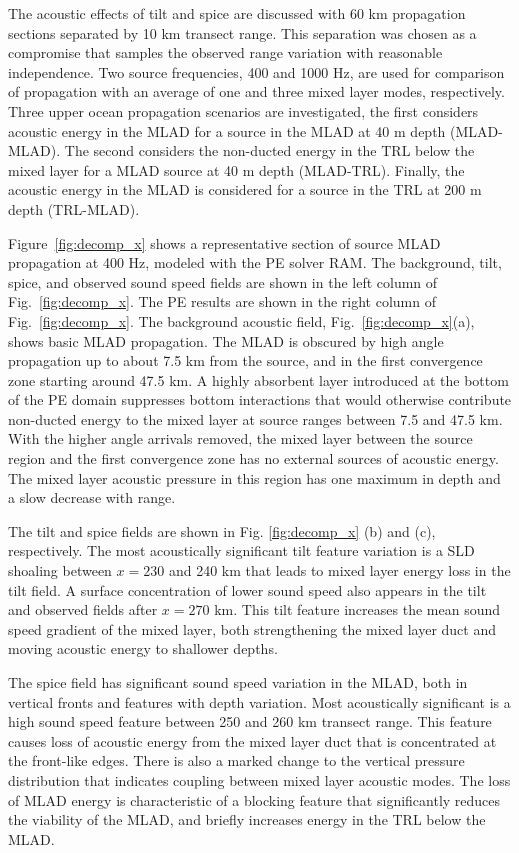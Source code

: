 \documentclass[preprint,NumberedRefs]{JASA}
\begin{document}
The acoustic effects of tilt and spice are discussed with 60 km propagation sections separated by 10 km transect range. This separation was chosen as a compromise that samples the observed range variation with reasonable independence. Two source frequencies, 400 and 1000 Hz, are used for comparison of propagation with an average of one and three mixed layer modes, respectively. Three upper ocean propagation scenarios are investigated, the first considers acoustic energy in the MLAD for a source in the MLAD at 40 m depth (MLAD-MLAD). The second considers the non-ducted energy in the TRL below the mixed layer for a MLAD source at 40 m depth (MLAD-TRL). Finally, the acoustic energy in the MLAD is considered for a source in the TRL at 200 m depth (TRL-MLAD).

Figure~\ref{fig:decomp_x} shows a representative section of source MLAD propagation at 400 Hz, modeled with the PE solver RAM\citep{collins93}. The background, tilt, spice, and observed sound speed fields are shown in the left column of Fig.~\ref{fig:decomp_x}. The PE results are shown in the right column  of Fig.~\ref{fig:decomp_x}. The background acoustic field, Fig.~\ref{fig:decomp_x}(a), shows basic MLAD propagation. The MLAD is obscured by high angle propagation up to about 7.5 km from the source, and in the first convergence zone starting around 47.5 km. A highly absorbent layer introduced at the bottom of the PE domain suppresses bottom interactions that would otherwise contribute non-ducted energy to the mixed layer at source ranges between 7.5 and 47.5 km. With the higher angle arrivals removed, the mixed layer between the source region and the first convergence zone has no external sources of acoustic energy. The mixed layer acoustic pressure in this region has one maximum in depth and a slow decrease with range.

The tilt and spice fields are shown in Fig. \ref{fig:decomp_x} (b) and (c), respectively. The most acoustically significant tilt feature variation is a SLD shoaling between $x=230$ and 240 km that leads to mixed layer energy loss in the tilt field. A surface concentration of lower sound speed also appears in the tilt and observed fields after $x=270$ km. This tilt feature increases the mean sound speed gradient of the mixed layer, both strengthening the mixed layer duct and moving acoustic energy to shallower depths.

The spice field has significant sound speed variation in the MLAD, both in vertical fronts and features with depth variation. Most acoustically significant is a high sound speed feature between 250 and 260 km transect range. This feature causes loss of acoustic energy from the mixed layer duct that is concentrated at the front-like edges. There is also a marked change to the vertical pressure distribution that indicates coupling between mixed layer acoustic modes. The loss of MLAD energy is characteristic of a blocking feature that significantly reduces the viability of the MLAD, and briefly increases energy in the TRL below the MLAD.
\end{document}
